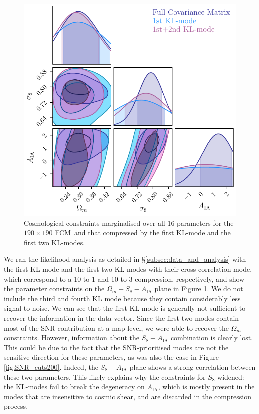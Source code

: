 \documentclass[twocolumn,nofootinbib]{\docclass}
\newcommand{\rf}[1]{Figure \ref{fig:#1}}
\newcommand{\rssec}[1]{\S\ref{subsec:#1}}
\newcommand\full{FCM}
\begin{document}
	\begin{figure}[b]
		\includegraphics[width=\columnwidth]{CompKL-constraints_wmS8A.pdf}
		\caption{Cosmological constraints marginalised over all 16 parameters for the  $190 \times 190$ \full\ and that compressed by the first KL-mode and the first two KL-modes.\label{fig:CompKL-constraints_wmS8A}}
	\end{figure}
	
	We ran the likelihood analysis as detailed in \rssec{data_and_analysis} with the first KL-mode and the first two KL-modes with their cross correlation mode, which correspond to a 10-to-1 and 10-to-3 compression, respectively, and show the parameter constraints on the $\Omega_m - S_8 - A_{\mathrm{IA}}$ plane in \rf{CompKL-constraints_wmS8A}. We do not include the third and fourth KL mode because they contain considerably less signal to noise. We can see that the first KL-mode is generally not sufficient to recover the information in the data vector. Since the first two modes contain most of the SNR contribution at a map level, we were able to recover the $\Omega_m$ constraints. However, information about the $S_8-A_{\mathrm{IA}}$ combination is clearly lost. This could be due to the fact that the SNR-prioritised modes are not the sensitive direction for these parameters, as was also the case in \rf{SNR_cuts200}. Indeed, the $S_8 - A_{\mathrm{IA}}$ plane shows a strong correlation between these two parameters. This likely explains why the constraints for $S_8$ widened: the KL-modes fail to break the degeneracy on $A_{\mathrm{IA}}$, which is mostly present in the modes that are insensitive to cosmic shear, and are discarded in the compression process.
	
\end{document}
